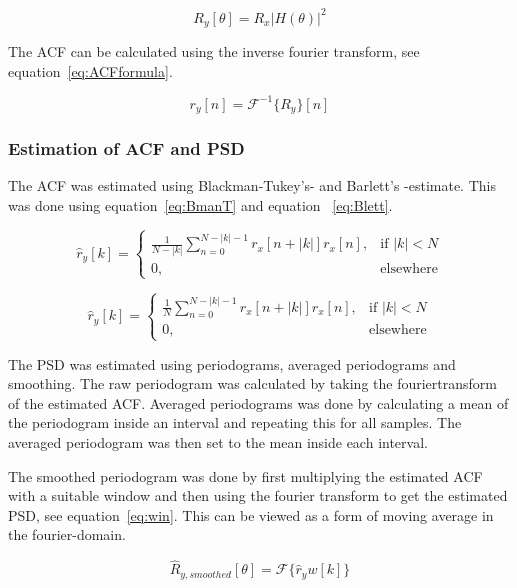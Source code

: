 \documentclass[10pt]{article}
\begin{document}
\begin{equation}
  \label{eq:PSDformula}
  R_y[\theta] = R_x|H(\theta)|^2
\end{equation}

The ACF can be calculated using the inverse fourier transform, see equation~\ref{eq:ACFformula}.

\begin{equation}
  \label{eq:ACFformula}
  r_y[n] = \mathcal{F}^{-1}\{R_y\}[n]
\end{equation}



\subsubsection{Estimation of ACF and PSD}
The ACF was estimated using Blackman-Tukey's- and Barlett's -estimate.
This was done using equation~\ref{eq:BmanT} and equation ~\ref{eq:Blett}.

\begin{equation}
\label{eq:BmanT}
\hat{r}_y[k] =
\begin{cases}
    \frac{1}{N-|k|}\sum_{n=0}^{N-|k|-1}r_x[n+|k|]r_x[n],& \text{if } |k|< N\\
    0,              & \text{elsewhere}
\end{cases}
\end{equation}


\begin{equation}
\label{eq:Blett}
\hat{r}_y[k] =
\begin{cases}
    \frac{1}{N}\sum_{n=0}^{N-|k|-1}r_x[n+|k|]r_x[n],& \text{if } |k|< N\\
    0,              & \text{elsewhere}
\end{cases}
\end{equation}

The PSD was estimated using periodograms, averaged periodograms
and smoothing. The raw periodogram was calculated by taking the fouriertransform
of the estimated ACF.
Averaged periodograms was done by calculating a mean of the periodogram inside
an interval and repeating this for all samples. The averaged periodogram was
then set to the mean inside each interval.

The smoothed periodogram was done by first multiplying the estimated ACF with a
 suitable window and then using the fourier transform to get the estimated PSD,
 see equation~\ref{eq:win}. This can be viewed as a form of moving average in the fourier-domain.

 \begin{equation}
 \label{eq:win}
 \hat{R}_{y,smoothed}[\theta] = \mathcal{F}\{\hat{r}_yw[k]\}
 \end{equation}
\end{document}
